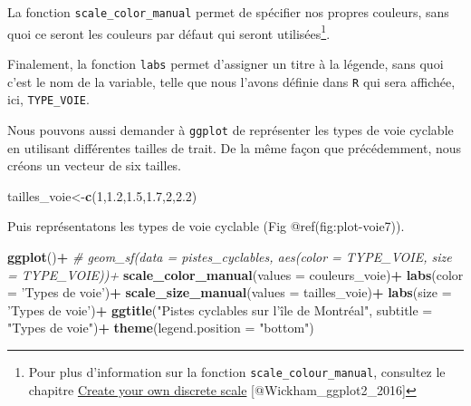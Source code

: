 \documentclass[]{article}
\newenvironment{Shaded}{\begin{snugshade}}{\end{snugshade}}
\newcommand{\KeywordTok}[1]{\textcolor[rgb]{0.13,0.29,0.53}{\textbf{#1}}}
\newcommand{\DataTypeTok}[1]{\textcolor[rgb]{0.13,0.29,0.53}{#1}}
\newcommand{\DecValTok}[1]{\textcolor[rgb]{0.00,0.00,0.81}{#1}}
\newcommand{\FloatTok}[1]{\textcolor[rgb]{0.00,0.00,0.81}{#1}}
\newcommand{\StringTok}[1]{\textcolor[rgb]{0.31,0.60,0.02}{#1}}
\newcommand{\CommentTok}[1]{\textcolor[rgb]{0.56,0.35,0.01}{\textit{#1}}}
\newcommand{\OperatorTok}[1]{\textcolor[rgb]{0.81,0.36,0.00}{\textbf{#1}}}
\newcommand{\NormalTok}[1]{#1}
\begin{document}
La fonction \texttt{scale\_color\_manual} permet de spécifier nos
propres couleurs, sans quoi ce seront les couleurs par défaut qui seront
utilisées\footnote{Pour plus d'information sur la fonction
  \texttt{scale\_colour\_manual}, consultez le chapitre
  \href{https://ggplot2.tidyverse.org/reference/scale_manual.html}{Create
  your own discrete scale} {[}@Wickham\_ggplot2\_2016{]}}.

Finalement, la fonction \texttt{labs} permet d'assigner un titre à la
légende, sans quoi c'est le nom de la variable, telle que nous l'avons
définie dans \texttt{R} qui sera affichée, ici, \texttt{TYPE\_VOIE}.

Nous pouvons aussi demander à \texttt{ggplot} de représenter les types
de voie cyclable en utilisant différentes tailles de trait. De la même
façon que précédemment, nous créons un vecteur de six tailles.

\begin{Shaded}
\begin{Highlighting}[]
\NormalTok{tailles_voie<-}\KeywordTok{c}\NormalTok{(}\DecValTok{1}\NormalTok{,}\FloatTok{1.2}\NormalTok{,}\FloatTok{1.5}\NormalTok{,}\FloatTok{1.7}\NormalTok{,}\DecValTok{2}\NormalTok{,}\FloatTok{2.2}\NormalTok{)}
\end{Highlighting}
\end{Shaded}

Puis représentatons les types de voie cyclable (Fig
@ref(fig:plot-voie7)).

\begin{Shaded}
\begin{Highlighting}[]
\KeywordTok{ggplot}\NormalTok{()}\OperatorTok{+}
\StringTok{  }\CommentTok{# geom_sf(data = pistes_cyclables,  aes(color = TYPE_VOIE, size = TYPE_VOIE))+}
\StringTok{  }\KeywordTok{scale_color_manual}\NormalTok{(}\DataTypeTok{values =}\NormalTok{ couleurs_voie)}\OperatorTok{+}
\StringTok{  }\KeywordTok{labs}\NormalTok{(}\DataTypeTok{color =} \StringTok{'Types de voie'}\NormalTok{)}\OperatorTok{+}
\StringTok{  }\KeywordTok{scale_size_manual}\NormalTok{(}\DataTypeTok{values =}\NormalTok{ tailles_voie)}\OperatorTok{+}
\StringTok{  }\KeywordTok{labs}\NormalTok{(}\DataTypeTok{size =} \StringTok{'Types de voie'}\NormalTok{)}\OperatorTok{+}
\StringTok{  }\KeywordTok{ggtitle}\NormalTok{(}\StringTok{"Pistes cyclables sur l'île de Montréal"}\NormalTok{, }\DataTypeTok{subtitle =} \StringTok{"Types de voie"}\NormalTok{)}\OperatorTok{+}
\StringTok{  }\KeywordTok{theme}\NormalTok{(}\DataTypeTok{legend.position =} \StringTok{"bottom"}\NormalTok{)}
\end{Highlighting}
\end{Shaded}
\end{document}
